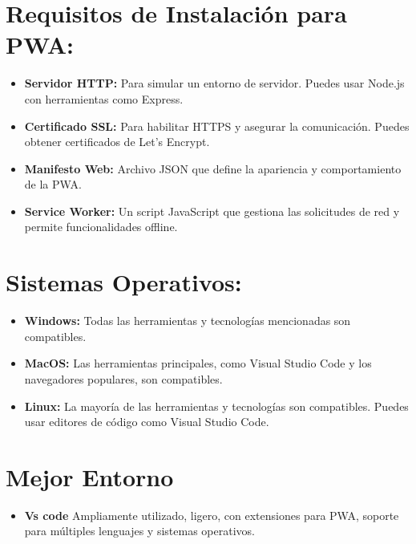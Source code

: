 \documentclass{article}
\begin{document}
\section*{Requisitos de Instalación para PWA:}
\begin{itemize}
    \item\textbf{Servidor HTTP:}
     Para simular un entorno de servidor. Puedes usar Node.js con herramientas como Express.
    \item\textbf{Certificado SSL:}
     Para habilitar HTTPS y asegurar la comunicación. Puedes obtener certificados de Let's Encrypt.
    \item\textbf{Manifesto Web:}
    Archivo JSON que define la apariencia y comportamiento de la PWA.
    \item\textbf{Service Worker:}
    Un script JavaScript que gestiona las solicitudes de red y permite funcionalidades offline.
\end{itemize}

\section*{Sistemas Operativos:}
\begin{itemize}
    \item\textbf{Windows:}
    Todas las herramientas y tecnologías mencionadas son compatibles.
    \item\textbf{MacOS:}
    Las herramientas principales, como Visual Studio Code y los navegadores populares, son compatibles.
    \item\textbf{Linux:}
    La mayoría de las herramientas y tecnologías son compatibles. Puedes usar editores de código como Visual Studio Code.
\end{itemize}

\section*{Mejor Entorno}
\begin{itemize}
    \item\textbf{Vs code}
    Ampliamente utilizado, ligero, con extensiones para PWA, soporte para múltiples lenguajes y sistemas operativos.
\end{itemize}
\end{document}
